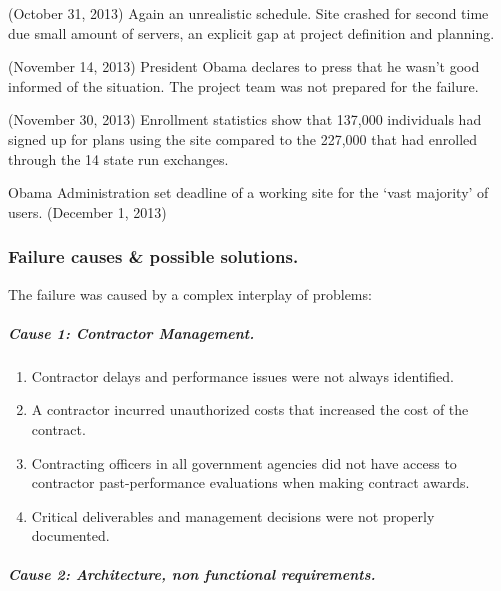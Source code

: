 \documentclass[]{article}
\providecommand{\tightlist}{%
  \setlength{\itemsep}{0pt}\setlength{\parskip}{0pt}}
\let\oldsubparagraph\subparagraph
\renewcommand{\subparagraph}[1]{\oldsubparagraph{#1}\mbox{}}
\begin{document}
(October 31, 2013) Again an unrealistic schedule. Site crashed for
second time due small amount of servers, an explicit gap at project
definition and planning.

(November 14, 2013) President Obama declares to press that he wasn't
good informed of the situation. The project team was not prepared for
the failure.

(November 30, 2013) Enrollment statistics show that 137,000 individuals
had signed up for plans using the site compared to the 227,000 that had
enrolled through the 14 state run exchanges.

Obama Administration set deadline of a working site for the `vast
majority' of users. (December 1, 2013)

\subsubsection{Failure causes \& possible
solutions.}\label{failure-causes-possible-solutions.}

The failure was caused by a complex interplay of problems:

\subparagraph{Cause 1: Contractor
Management.}\label{cause-1-contractor-management.}

\begin{enumerate}
\def\labelenumi{\arabic{enumi}.}
\setcounter{enumi}{5}
\tightlist
\item
  Contractor delays and performance issues were not always identified.
\item
  A contractor incurred unauthorized costs that increased the cost of
  the contract.
\item
  Contracting officers in all government agencies did not have access to
  contractor past-performance evaluations when making contract awards.
\item
  Critical deliverables and management decisions were not properly
  documented.
\end{enumerate}

\subparagraph{Cause 2: Architecture, non functional
requirements.}\label{cause-2-architecture-non-functional-requirements.}
\end{document}
